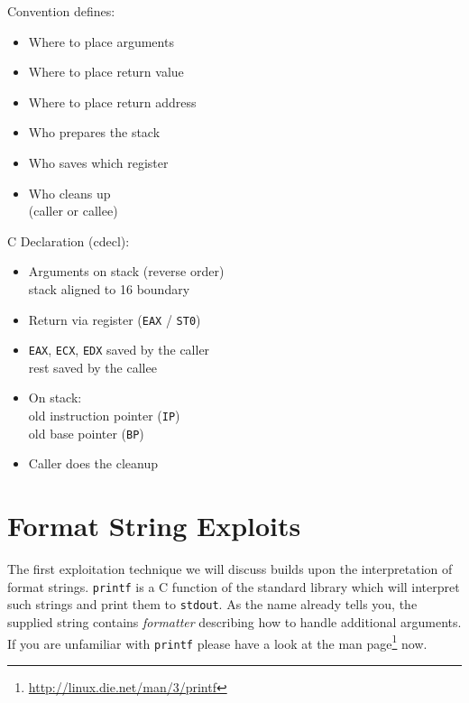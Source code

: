 \documentclass[article]{uibk}
\begin{document}
\begin{minipage}[t]{0.48\textwidth}
    Convention defines:
    \begin{itemize}
        \item Where to place arguments
        \item Where to place return value
        \item Where to place return address
        \item Who prepares the stack
        \item Who saves which register
        \item Who cleans up\\
            (caller or callee)
    \end{itemize}
\end{minipage}\hfill
\begin{minipage}[t]{0.48\textwidth}
    C Declaration (cdecl):
    \begin{itemize}
        \item Arguments on stack (reverse order)\\
            stack aligned to \SI{16}{\byte} boundary
        \item Return via register (\texttt{EAX} / \texttt{ST0})
        \item \texttt{EAX}, \texttt{ECX}, \texttt{EDX} saved by the caller\\
            rest saved by the callee
        \item On stack:\\
            old instruction pointer (\texttt{IP})\\
            old base pointer (\texttt{BP})
        \item Caller does the cleanup
    \end{itemize}
\end{minipage}

\section{Format String Exploits}
\label{sec:format_string_exploit}

The first exploitation technique we will discuss builds upon the interpretation
of format strings. \texttt{printf} is a C function of the standard library
which will interpret such strings and print them to \texttt{stdout}. As the
name already tells you, the supplied string contains \textit{formatter}
describing how to handle additional arguments. If you are unfamiliar with
\texttt{printf} please have a look at the man
page\footnote{\url{http://linux.die.net/man/3/printf}} now.
\end{document}
